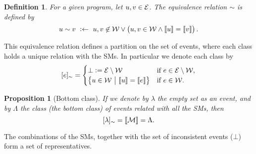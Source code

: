 \documentclass[a4paper]{article}
\newtheorem{definition}{Definition}
\newtheorem{proposition}{Proposition}
\newtheorem{definition}{Definition}
\newtheorem{proposition}{Proposition}
\newcommand{\cla}[1]{\ensuremath{{\cal #1}}}        %
\newcommand{\clause}{\ensuremath{\leftarrow}}
\newcommand{\MODELset}{\ensuremath{\cla{M}}}
\newcommand{\EVENTSset}{\ensuremath{\cla{E}}}
\newcommand{\CONSISTset}{\ensuremath{\cla{W}}}
\newcommand{\stablecore}[1]{\ensuremath{\left\llbracket #1 \right\rrbracket}}
\newcommand{\inconsistent}{\bot}
\newcommand{\given}{\ensuremath{~\middle|~}}
\newcommand{\bottomclass}{\ensuremath{\Lambda}}
\newcommand{\class}[1]{\ensuremath{[{#1}]_{\sim}}}
\newcommand{\emptyevent}{\ensuremath{\lambda}}
\newcommand{\franc}[1]{{\color{green!30!black}#1}}
\begin{document}
\begin{definition}\label{def:equiv.rel}
  For a given program, let $u, v \in \EVENTSset$.  The equivalence
  relation \(\sim\) is defined by
  \begin{equation}
        u \sim v\ :\clause\ u,v \not\in\CONSISTset \vee \del{u,v \in \CONSISTset \wedge \stablecore{u} = \stablecore{v}}.\label{eq:equiv.rel}
  \end{equation}
\end{definition}
This equivalence relation defines a partition on the set of events,
where each class holds a unique relation with the \aclp{SM}.  In
particular we denote each class by
\begin{equation}
    \class{e} =
    \begin{cases}
        \inconsistent := \EVENTSset \setminus \CONSISTset
         & \text{if~} e \in \EVENTSset \setminus \CONSISTset, \\
        \set{u \in \CONSISTset \given \stablecore{u} = \stablecore{e}}
         & \text{if~} e \in \CONSISTset.
    \end{cases}\label{eq:event.class}
\end{equation}

\franc{
\begin{proposition}[Bottom class]\label{prop:bottom.class}
  If we denote by \(\emptyevent\) the empty set as an event, and by
  \(\bottomclass\) the class (the \emph{bottom class}) of events
  related with all the \aclp{SM}, then
    \begin{equation}
        \class{\emptyevent} = \stablecore{\MODELset} = \bottomclass.
    \end{equation}    
\end{proposition}
}

The combinations of the \aclp{SM}, together with the set of
inconsistent events (\(\inconsistent\)) form a set of representatives.
\end{document}
